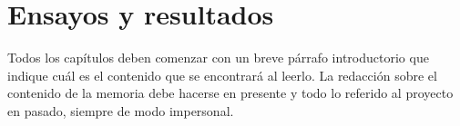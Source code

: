
\chapter{Ensayos y resultados} %

\label{Chapter4} %
Todos los capítulos deben comenzar con un breve párrafo introductorio que indique cuál es el contenido que se encontrará al leerlo.  La redacción sobre el contenido de la memoria debe hacerse en presente y todo lo referido al proyecto en pasado, siempre de modo impersonal.



